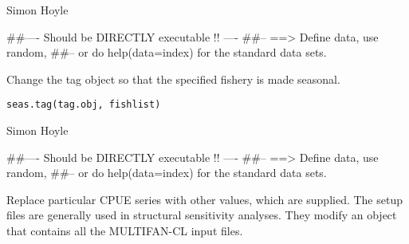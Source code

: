 \documentclass[a4paper]{book}
\begin{document}
%
\begin{Author}\relax

Simon Hoyle
\end{Author}
%
\begin{Examples}
\begin{ExampleCode}
##---- Should be DIRECTLY executable !! ----
##-- ==>  Define data, use random,
##--	or do  help(data=index)  for the standard data sets.

\end{ExampleCode}
\end{Examples}
%
\begin{Description}\relax

Change the tag object so that the specified fishery is made seasonal. 
\end{Description}
%
\begin{Usage}
\begin{verbatim}
seas.tag(tag.obj, fishlist)
\end{verbatim}
\end{Usage}
%
\begin{Arguments}
\begin{ldescription}
\item[\code{tag.obj}] 


\item[\code{fishlist}] 


\end{ldescription}
\end{Arguments}
%
\begin{Author}\relax

Simon Hoyle
\end{Author}
%
\begin{Examples}
\begin{ExampleCode}
##---- Should be DIRECTLY executable !! ----
##-- ==>  Define data, use random,
##--	or do  help(data=index)  for the standard data sets.

\end{ExampleCode}
\end{Examples}
%
\begin{Description}\relax

Replace particular CPUE series with other values, which are supplied. 
The setup files are generally used in structural sensitivity analyses. They modify an object that contains all the MULTIFAN-CL input files. 
\end{Description}
\end{document}
